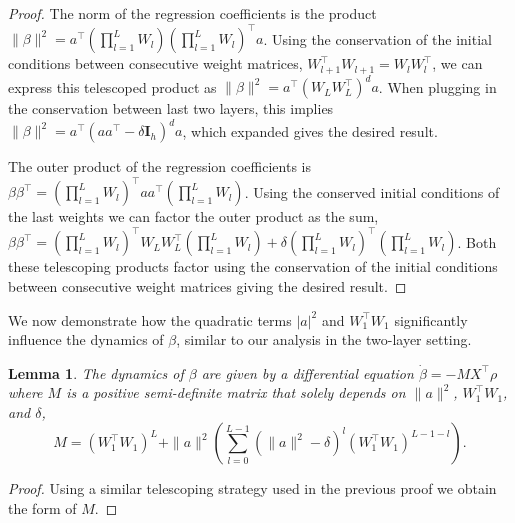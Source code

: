 \documentclass{article}
\theoremstyle{plain}
\newtheorem{lemma}[theorem]{Lemma}
\theoremstyle{definition}
\theoremstyle{remark}
\begin{document}
\begin{proof}
    The norm of the regression coefficients is the product $\|\beta\|^2 = a^\intercal\left(\prod_{l=1}^{L}W_l\right)\left(\prod_{l=1}^{L}W_l\right)^\intercal a$.
    Using the conservation of the initial conditions between consecutive weight matrices, $W_{l+1}^\intercal W_{l+1} = W_lW_l^\intercal$, we can express this telescoped product as $\|\beta\|^2 = a^\intercal\left(W_LW_L^\intercal\right)^d a$.
    When plugging in the conservation between last two layers, this implies $\|\beta\|^2 = a^\intercal\left(aa^\intercal - \delta \mathbf{I}_h\right)^d a$, which expanded gives the desired result.
    

    The outer product of the regression coefficients is $\beta \beta^\intercal = \left(\prod_{l=1}^{L}W_l\right)^\intercal aa^\intercal\left(\prod_{l=1}^{L}W_l\right)$.
    Using the conserved initial conditions of the last weights we can factor the outer product as the sum, $\beta \beta^\intercal = \left(\prod_{l=1}^{L}W_l\right)^\intercal W_LW_L^\intercal\left(\prod_{l=1}^{L}W_l\right) + \delta\left(\prod_{l=1}^{L}W_l\right)^\intercal \left(\prod_{l=1}^{L}W_l\right)$.
    Both these telescoping products factor using the conservation of the initial conditions between consecutive weight matrices giving the desired result.
\end{proof}

We now demonstrate how the quadratic terms $|a|^2$ and $W_1^\intercal W_1$ significantly influence the dynamics of $\beta$, similar to our analysis in the two-layer setting.

\begin{lemma}
    \label{lemma:beta-dynamics-d-layer}
    The dynamics of $\beta$ are given by a differential equation $\dot{\beta} = -M X^\intercal \rho$ where $M$ is a positive semi-definite matrix that solely depends on $\|a\|^2$, $W_1^\intercal W_1$, and $\delta$,
    \begin{equation}
        M =  \left(W_1^\intercal W_1\right)^L + \|a\|^2 \left(\sum_{l=0}^{L-1}(\|a\|^2 - \delta)^l\left(W_1^\intercal W_1\right)^{L-1-l}\right).
    \end{equation}
\end{lemma}

\begin{proof}
    Using a similar telescoping strategy used in the previous proof we obtain the form of $M$.
\end{proof}
\end{document}

